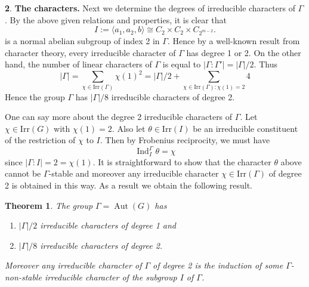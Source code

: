 \documentclass[12pt]{article}
\theoremstyle{plain}
\newtheorem{theorem}{Theorem}[section]
\theoremstyle{definition}
\newtheorem{nothing}[theorem]{}
\newcommand{\ind}{\operatorname{Ind}}
\newcommand{\Aut}{\operatorname{Aut}}
\begin{document}
\begin{nothing} {\textbf{The characters.}}
Next we determine the degrees of irreducible characters of $\Gamma$. By the above given relations and properties, it is clear that 
\[
I:= \langle a_1, a_2, b\rangle \cong C_2\times C_2\times C_{2^{m-2}}.
\]
 is a normal abelian subgroup of index 2 in $\Gamma$. Hence by a well-known result from character theory, every irreducible character of $\Gamma$ has degree 1 or 2. On the other hand, the number of linear characters of $\Gamma$ is equal to $|\Gamma: \Gamma'| = |\Gamma|/2$. Thus
\[
|\Gamma | = \sum_{\chi\in\text{Irr}(\Gamma)}\chi(1)^2 = |\Gamma|/2 + 
\sum_{\chi\in\text{Irr}(\Gamma): \chi(1) = 2}4
\]
Hence the group $\Gamma$ has $|\Gamma|/8$ irreducible characters of degree 2. 

One can say more about the degree 2 irreducible characters of $\Gamma$. Let $\chi\in\text{Irr}(G)$ with $\chi(1)=2$. Also let $\theta\in\text{Irr}(I)$ be an irreducible constituent of the restriction of $\chi$ to $I$. Then by Frobenius reciprocity, we must have
\[
\ind_I^\Gamma\theta = \chi
\]
since $|\Gamma: I| = 2 = \chi(1)$. It is straightforward to show that the character $\theta$ above cannot be $\Gamma$-stable and moreover any irreducible character $\chi\in\text{Irr}(\Gamma)$ of degree 2 is obtained in this way. 
As a result we obtain the following result.
\begin{theorem}\label{thm:chars}
    The group $\Gamma = \Aut(G)$ has 
    \begin{enumerate}
        \item $|\Gamma|/2$ irreducible characters of degree 1 and
        \item $|\Gamma|/8$ irreducible characters of degree 2.
    \end{enumerate}
    Moreover any irreducible character of $\Gamma$ of degree 2 is the induction of some $\Gamma$-non-stable irreducible character of the subgroup $I$ of $\Gamma$.
\end{theorem}
\end{nothing}
\end{document}
